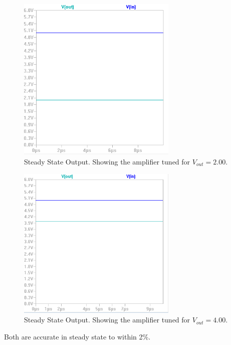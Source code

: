 \documentclass[10pt]{amsart}
\begin{document}
\begin{figure}[h]
	\begin{center}
		\includegraphics[width=3in]{Media/ss1.png}
	\end{center}
	\caption{Steady State Output. Showing the amplifier tuned for $V_{out} = 2.00$.}
	\label{fig:pidfb}
\end{figure}

\begin{figure}[h]
	\begin{center}
		\includegraphics[width=3in]{Media/ss2.png}
	\end{center}
	\caption{Steady State Output. Showing the amplifier tuned for $V_{out} = 4.00$.}
	\label{fig:pidfb}
\end{figure}

Both are accurate in steady state to within 2\%.
\end{document}
